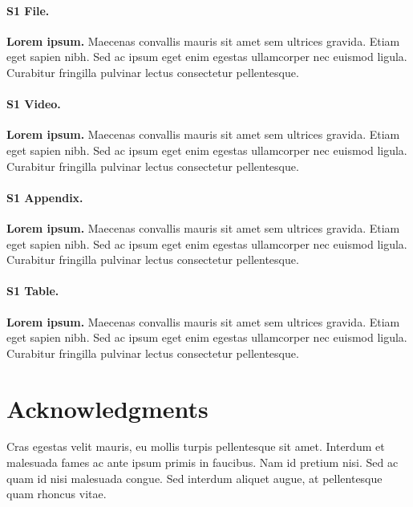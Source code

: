 \documentclass[10pt,letterpaper]{article}
\begin{document}
\paragraph*{S1 File.}
\label{S1_File}
{\bf Lorem ipsum.}  Maecenas convallis mauris sit amet sem ultrices gravida. Etiam eget sapien nibh. Sed ac ipsum eget enim egestas ullamcorper nec euismod ligula. Curabitur fringilla pulvinar lectus consectetur pellentesque.

\paragraph*{S1 Video.}
\label{S1_Video}
{\bf Lorem ipsum.}  Maecenas convallis mauris sit amet sem ultrices gravida. Etiam eget sapien nibh. Sed ac ipsum eget enim egestas ullamcorper nec euismod ligula. Curabitur fringilla pulvinar lectus consectetur pellentesque.

\paragraph*{S1 Appendix.}
\label{S1_Appendix}
{\bf Lorem ipsum.} Maecenas convallis mauris sit amet sem ultrices gravida. Etiam eget sapien nibh. Sed ac ipsum eget enim egestas ullamcorper nec euismod ligula. Curabitur fringilla pulvinar lectus consectetur pellentesque.

\paragraph*{S1 Table.}
\label{S1_Table}
{\bf Lorem ipsum.} Maecenas convallis mauris sit amet sem ultrices gravida. Etiam eget sapien nibh. Sed ac ipsum eget enim egestas ullamcorper nec euismod ligula. Curabitur fringilla pulvinar lectus consectetur pellentesque.

\section*{Acknowledgments}
Cras egestas velit mauris, eu mollis turpis pellentesque sit amet. Interdum et malesuada fames ac ante ipsum primis in faucibus. Nam id pretium nisi. Sed ac quam id nisi malesuada congue. Sed interdum aliquet augue, at pellentesque quam rhoncus vitae.

\nolinenumbers

%
%
% 
\end{document}
